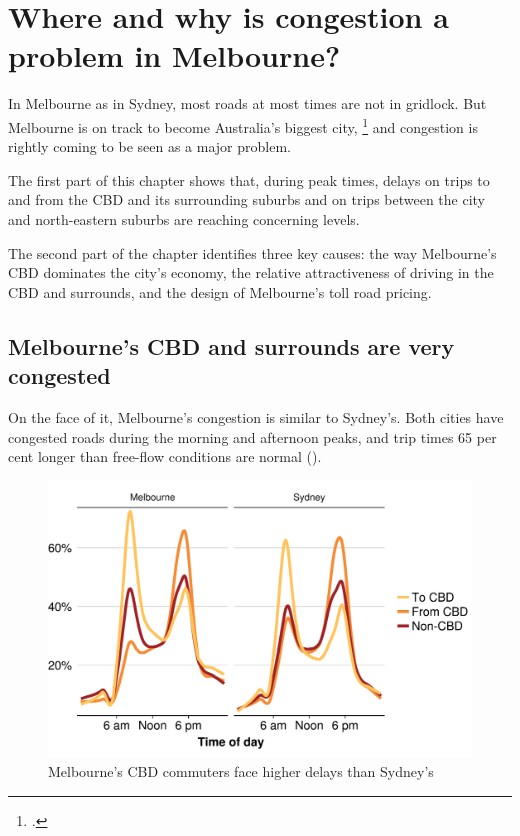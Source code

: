 \documentclass{grattan}
\begin{document}
\chapter{Where and why is congestion a problem in Melbourne?}\label{chap:Melbourne-congestion}

In Melbourne as in Sydney, most roads at most times are not in gridlock. But Melbourne is on track to become Australia's biggest city,%
    \footcite[][27]{IA-2015-State-of-Australian-Cities-2014-2015}
and congestion is rightly coming to be seen as a major problem.

The first part of this chapter shows that, during peak times, delays on trips to and from the CBD and its surrounding suburbs and on trips between the city and north-eastern suburbs are reaching concerning levels.

The second part of the chapter identifies three key causes: the way Melbourne's CBD dominates the city's economy, the relative attractiveness of driving in the CBD and surrounds, and the design of Melbourne's toll road pricing.

\section{Melbourne's CBD and surrounds are very congested}

On the face of it, Melbourne's congestion is similar to Sydney's. Both cities have congested roads during the morning and afternoon peaks, and trip times 65 per cent longer than free-flow conditions are normal ().

\begin{figure}
\caption{Melbourne's CBD commuters face higher delays than Sydney's}\label{fig:Melb-CBD-v-Non-CBD-commutes}
\includegraphics{atlas/increase-in-travel-time-vs-time-of-day-by-Classification-CBD-commuting--facet-by-City-1.pdf}
\end{figure}
\end{document}
